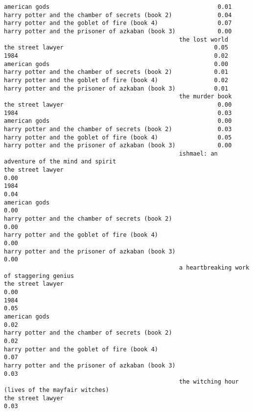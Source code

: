 \documentclass[
]{report}
\begin{document}
\begin{verbatim}
american gods                                                0.01
harry potter and the chamber of secrets (book 2)             0.04
harry potter and the goblet of fire (book 4)                 0.07
harry potter and the prisoner of azkaban (book 3)            0.00
                                                  the lost world
the street lawyer                                           0.05
1984                                                        0.02
american gods                                               0.00
harry potter and the chamber of secrets (book 2)            0.01
harry potter and the goblet of fire (book 4)                0.02
harry potter and the prisoner of azkaban (book 3)           0.01
                                                  the murder book
the street lawyer                                            0.00
1984                                                         0.03
american gods                                                0.00
harry potter and the chamber of secrets (book 2)             0.03
harry potter and the goblet of fire (book 4)                 0.05
harry potter and the prisoner of azkaban (book 3)            0.00
                                                  ishmael: an adventure of the mind and spirit
the street lawyer                                                                         0.00
1984                                                                                      0.04
american gods                                                                             0.00
harry potter and the chamber of secrets (book 2)                                          0.00
harry potter and the goblet of fire (book 4)                                              0.00
harry potter and the prisoner of azkaban (book 3)                                         0.00
                                                  a heartbreaking work of staggering genius
the street lawyer                                                                      0.00
1984                                                                                   0.05
american gods                                                                          0.02
harry potter and the chamber of secrets (book 2)                                       0.02
harry potter and the goblet of fire (book 4)                                           0.07
harry potter and the prisoner of azkaban (book 3)                                      0.03
                                                  the witching hour (lives of the mayfair witches)
the street lawyer                                                                             0.03

\end{verbatim}
\end{document}
